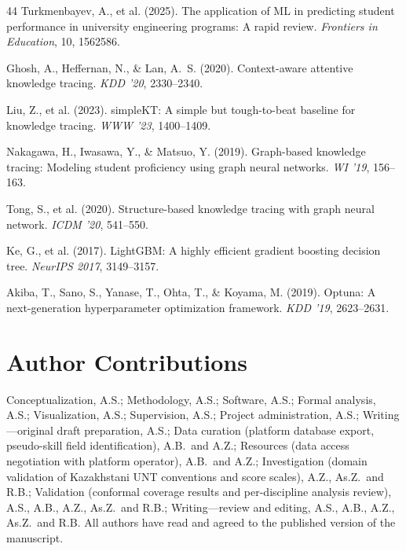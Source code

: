 \documentclass[11pt]{article}
\begin{document}
\begin{thebibliography}{44}
Turkmenbayev, A., et al. (2025). The application of ML in predicting student performance
in university engineering programs: A rapid review. \textit{Frontiers in Education}, 10,
1562586.


Ghosh, A., Heffernan, N., \& Lan, A.~S. (2020).
Context-aware attentive knowledge tracing.
\textit{KDD '20}, 2330--2340.

Liu, Z., et al. (2023).
simpleKT: A simple but tough-to-beat baseline for knowledge tracing.
\textit{WWW '23}, 1400--1409.

Nakagawa, H., Iwasawa, Y., \& Matsuo, Y. (2019).
Graph-based knowledge tracing: Modeling student proficiency using graph neural networks.
\textit{WI '19}, 156--163.

Tong, S., et al. (2020).
Structure-based knowledge tracing with graph neural network.
\textit{ICDM '20}, 541--550.

Ke, G., et al. (2017).
LightGBM: A highly efficient gradient boosting decision tree.
\textit{NeurIPS 2017}, 3149--3157.

Akiba, T., Sano, S., Yanase, T., Ohta, T., \& Koyama, M. (2019).
Optuna: A next-generation hyperparameter optimization framework.
\textit{KDD '19}, 2623--2631.

\end{thebibliography}


\section*{Author Contributions}
Conceptualization, A.S.; Methodology, A.S.; Software, A.S.; Formal analysis, A.S.;
Visualization, A.S.; Supervision, A.S.; Project administration, A.S.;
Writing---original draft preparation, A.S.;
Data curation (platform database export, pseudo-skill field identification), A.B.\ and A.Z.;
Resources (data access negotiation with platform operator), A.B.\ and A.Z.;
Investigation (domain validation of Kazakhstani UNT conventions and score scales), A.Z., As.Z.\ and R.B.;
Validation (conformal coverage results and per-discipline analysis review), A.S., A.B., A.Z., As.Z.\ and R.B.;
Writing---review and editing, A.S., A.B., A.Z., As.Z.\ and R.B.
All authors have read and agreed to the published version of the manuscript.
\end{document}
